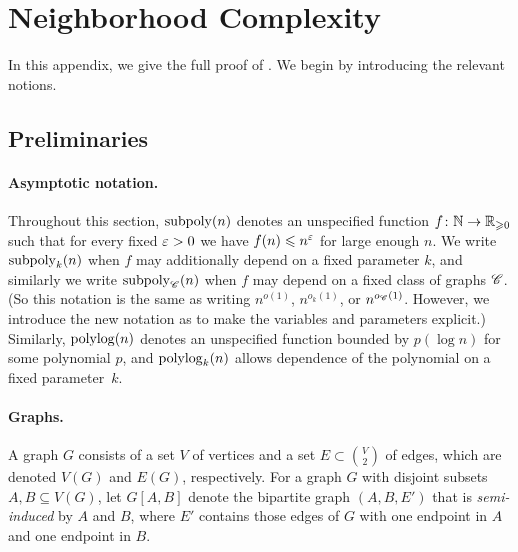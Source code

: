 \section{Neighborhood Complexity}
\label{apn:nc}

In this appendix, we give the full proof of .
We begin by introducing the relevant notions.
\subsection{Preliminaries}
\label{apn:prelims}



\paragraph{Asymptotic notation.}
Throughout this section, $\operatorname{subpoly}(n)$ denotes an unspecified function $f\colon\mathbb{N}\to\mathbb R_{\geqslant 0}$ such that for every fixed $\varepsilon>0$ we have $f(n)\leqslant n^\varepsilon$ for large enough $n$. We write $\operatorname{subpoly}_k(n)$ when $f$ may additionally depend on a fixed parameter $k$, and similarly we write $\operatorname{subpoly}_{{\mathscr C}}(n)$ when $f$ may depend on a fixed class of graphs ${\mathscr C}$. (So this notation is the same as writing $n^{o(1)}$, $n^{o_k(1)}$, or $n^{o_{{\mathscr C}}(1)}$. However, we introduce the new notation as to make the variables and parameters explicit.) Similarly, $\operatorname{polylog}(n)$ denotes an unspecified function bounded by $p(\log n)$ for some polynomial $p$, and $\operatorname{polylog}_k(n)$ allows dependence of the polynomial on a fixed parameter~$k$.


\paragraph{Graphs.}
A graph $G$ consists of a set $V$ of vertices and a set $E\subset {V\choose 2}$ of edges, which are denoted $V(G)$ and $E(G)$, respectively.
For a graph $G$ with disjoint subsets $A,B \subseteq V(G)$,  let $G[A,B]$ denote the bipartite graph $(A,B,E')$ that is \emph{semi-induced} by $A$ and $B$, where $E'$ contains those edges of $G$ with one endpoint in $A$ and one endpoint in $B$.

